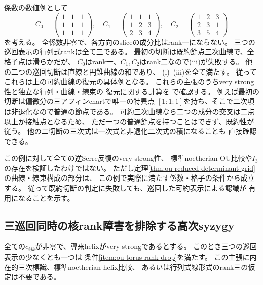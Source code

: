 \begin{example}[巡回した可約表示への帰着]
\label{ex:ou-cyclic-grid-rotation}
係数の数値例として
\[
 C_0=\begin{pmatrix}1&1&1\\1&1&1\\1&1&1\end{pmatrix},\quad
 C_1=\begin{pmatrix}1&1&1\\1&2&3\\2&3&4\end{pmatrix},\quad
 C_2=\begin{pmatrix}1&2&3\\2&3&1\\3&5&4\end{pmatrix}
\]
を考える。
全係数非零で、各方向のsliceの成分比はrank一にならない。
三つの巡回表示の行列式rankは全て三である。
最初の切断は既約節点三次曲線で、全格子点は滑らかだが、
$C_0$はrank一、$C_1,C_2$はrank二なので(iii)が失敗する。
他の二つの巡回切断は直線と円錐曲線の和であり、
(i)--(iii)を全て満たす。
従ってこれらは上の可約曲線の復元の具体例となる。
これらの主張のうちvery strong性と独立な行列・曲線・線束の
復元に関する計算を
で確認する。
例えば最初の切断は偏微分の三アフィンchartで唯一の特異点
$[1:1:1]$を持ち、そこで二次項は非退化なので普通の節点である。
可約三次曲線なら二つの成分の交叉は二点以上か接触点となるため、
ただ一つの普通節点を持つことはできず、既約性が従う。
他の二切断の三次式は一次式と非退化二次式の積になることも
直接確認できる。

この例に対して全ての逆Serre反復のvery strong性、
標準noetherian OU比較や$I_3$の存在を検証したわけではない。
ただし定理\ref{thm:ou-reduced-determinant-grid}の曲線・線束構成の部分は、
この例で実際に満たす係数・格子の条件から成立する。
従って既約切断の判定に失敗しても、巡回した可約表示による認識が
有用になることを示す。
\end{example}

\subsection{三巡回同時の核rank障害を排除する高次syzygy}
\label{subsec:ou-dense-higher-syzygies}

\begin{theorem}[全係数非零の場合の三巡回同時rank落ちの排除]
\label{thm:ou-dense-no-triple-torus-failure}
全ての$c_{ijk}$が非零で、導来helixがvery strongであるとする。
このとき三つの巡回表示の少なくとも一つは
条件\ref{item:ou-torus-rank-drop}を満たす。
この主張に内在的三次標識、標準noetherian helix比較、
あるいは行列式線形式のrank三の仮定は不要である。
\end{theorem}

